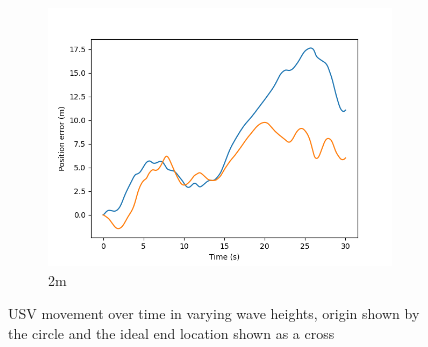 \documentclass[class=article, crop=false]{standalone}
\begin{document}
\begin{figure}
\begin{subfigure}[b]{0.48\textwidth}
        \centering
        \includegraphics{scenario1/rov-0m/2.0m/usv_pos_error_controlled}
        \caption{2m}
        \label{}
    \end{subfigure}
    \caption{USV movement over time in varying wave heights, origin shown by the circle and the ideal end location shown as a cross}
    \label{}
\end{figure}
\end{document}
